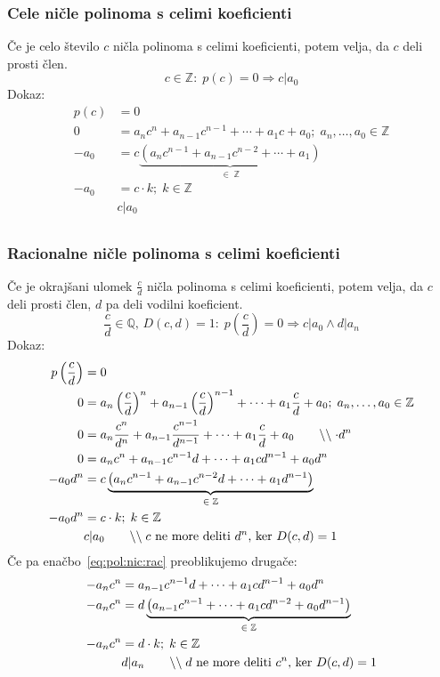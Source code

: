 \documentclass[a4paper,oneside,12pt,fleqn]{article}
\def\Z{\ensuremath{\mathbb Z}}
\def\Q{\ensuremath{\mathbb Q}}
\newcommand\krat\cdot
\newcommand{\comment}[1]{\ensuremath{\qquad\backslash\backslash\;}\textnormal{#1}}
\renewcommand\implies\Rightarrow
\numberwithin{equation}{section}
\begin{document}
\subsubsection{Cele ničle polinoma s celimi koeficienti}
\label{sec:pol:nic:cel}
Če je celo število $c$ ničla polinoma s celimi koeficienti, potem velja, da $c$ deli
prosti člen.
\[ c \in \Z\colon\;p(c) = 0 \implies c|a_0 \]
Dokaz:
\begin{align*}
  p(c) &= 0 \\
  0 &= a_nc^n+a_{n-1}c^{n-1}+\cdots+a_1c+a_0; \; a_n,\ldots,a_0 \in \Z \\
  -a_0 &= c\underbrace{\left(a_nc^{n-1} + a_{n-1}c^{n-2} +\cdots+a_1\right)}_{\in\;\Z} \\
  -a_0 &= c \krat k; \; k \in \Z \\
  &c | a_0 \\
\end{align*}

\subsubsection{Racionalne ničle polinoma s celimi koeficienti}
\label{sec:pol:nic:rac}
Če je okrajšani ulomek $\frac{c}{d}$ ničla polinoma s celimi koeficienti, potem velja, da $c$ deli
prosti člen, $d$ pa deli vodilni koeficient.
\[ \frac{c}{d} \in \Q,\,D(c,d)=1\colon\;p\left( \frac{c}{d} \right) = 0 \implies
c|a_0 \land d|a_n \]
Dokaz:
\begin{align}
  p\left(\frac{c}{d}\right) &= 0 \nonumber \\
  0 &= a_n\left(\frac{c}{d}\right)^n+a_{n-1}\left(\frac{c}{d}\right)^{n-1}+\cdots+a_1\frac{c}{d}+a_0; \; a_n,\ldots,a_0 \in \Z \nonumber \\
  0 &= a_n\frac{c^n}{d^n}+a_{n-1}\frac{c^{n-1}}{d^{n-1}}+\cdots+a_1\frac{c}{d}+a_0
  \comment{$\krat d^n$} \nonumber \\
  0 &= a_nc^n+a_{n-1}c^{n-1}d+\cdots+a_1cd^{n-1}+a_0d^n \label{eq:pol:nic:rac} \\
  -a_0d^n &= c\underbrace{\left(a_nc^{n-1}+a_{n-1}c^{n-2}d+\cdots+a_1d^{n-1}\right)}_{\in\;\Z} \nonumber \\
  -a_0d^n &= c \krat k; \; k \in \Z \nonumber \\
  & c|a_0 \comment{$c$ ne more deliti $d^n$, ker $D(c,d)=1$} \nonumber
\end{align}
Če pa enačbo~\eqref{eq:pol:nic:rac} preoblikujemo drugače:
\begin{align*}
  -a_nc^n &= a_{n-1}c^{n-1}d+\cdots+a_1cd^{n-1}+a_0d^n \\
  -a_nc^n &= d\underbrace{\left(a_{n-1}c^{n-1}+\cdots+a_1cd^{n-2}+a_0d^{n-1}\right)}_{\in\;\Z} \\
  -a_nc^n &= d \krat k; \; k \in \Z \\
  & d|a_n \comment{$d$ ne more deliti $c^n$, ker $D(c,d)=1$}
\end{align*}
\end{document}
